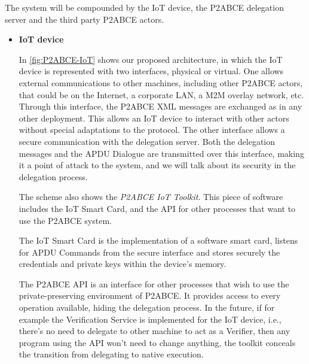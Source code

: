 \documentclass[journal]{IEEEtran}
\begin{document}

\hfil


The system will be compounded by the IoT device, the P2ABCE delegation server and the third party P2ABCE actors.

\begin{itemize}
	
	\item \textbf{IoT device}
	
	In \autoref{fig:P2ABCE-IoT} shows our proposed architecture, in which the IoT device is represented with two interfaces, physical or virtual. One allows external communications to other machines, including other P2ABCE actors, that could be on the Internet, a corporate LAN, a M2M overlay network, etc. Through this interface, the P2ABCE XML messages are exchanged as in any other deployment. This allows an IoT device to interact with other actors without special adaptations to the protocol. The other interface allows a secure communication with the delegation server. Both the delegation messages and the APDU Dialogue are transmitted over this interface, making it a point of attack to the system, and we will talk about its security in the delegation process.
	
	The scheme also shows the \textit{P2ABCE IoT Toolkit}. This piece of software includes the IoT Smart Card, and the API for other processes that want to use the P2ABCE system.
	
	The IoT Smart Card is the implementation of a software smart card, listens for APDU Commands from the secure interface and stores securely the credentials and private keys within the device's memory.
	
	The P2ABCE API is an interface for other processes that wish to use the private-preserving environment of P2ABCE. It provides access to every operation available, hiding the delegation process. In the future, if for example the Verification Service is implemented for the IoT device, i.e., there's no need to delegate to other machine to act as a Verifier, then any program using the API won't need to change anything, the toolkit conceals the transition from delegating to native execution.
	

\end{itemize}
\end{document}
